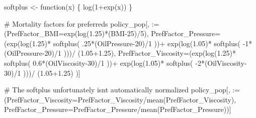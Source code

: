 \documentclass[
  letterpaper,
  DIV=11,
  numbers=noendperiod]{scrartcl}
\newenvironment{Shaded}{\begin{snugshade}}{\end{snugshade}}
\newcommand{\AttributeTok}[1]{\textcolor[rgb]{0.40,0.45,0.13}{#1}}
\newcommand{\CommentTok}[1]{\textcolor[rgb]{0.37,0.37,0.37}{#1}}
\newcommand{\ControlFlowTok}[1]{\textcolor[rgb]{0.00,0.23,0.31}{#1}}
\newcommand{\DecValTok}[1]{\textcolor[rgb]{0.68,0.00,0.00}{#1}}
\newcommand{\FloatTok}[1]{\textcolor[rgb]{0.68,0.00,0.00}{#1}}
\newcommand{\FunctionTok}[1]{\textcolor[rgb]{0.28,0.35,0.67}{#1}}
\newcommand{\NormalTok}[1]{\textcolor[rgb]{0.00,0.23,0.31}{#1}}
\newcommand{\OtherTok}[1]{\textcolor[rgb]{0.00,0.23,0.31}{#1}}
\newcommand{\SpecialCharTok}[1]{\textcolor[rgb]{0.37,0.37,0.37}{#1}}
\newcommand{\StringTok}[1]{\textcolor[rgb]{0.13,0.47,0.30}{#1}}
\begin{document}
\begin{Shaded}
\begin{Highlighting}[]
\NormalTok{softplus }\OtherTok{\textless{}{-}} \ControlFlowTok{function}\NormalTok{(x) \{}
  \FunctionTok{log}\NormalTok{(}\DecValTok{1}\SpecialCharTok{+}\FunctionTok{exp}\NormalTok{(x))}
\NormalTok{\}}

\CommentTok{\# Mortality factors for preferreds}
\NormalTok{policy\_pop[,}
           \StringTok{\textasciigrave{}}\AttributeTok{:=}\StringTok{\textasciigrave{}}\NormalTok{(}\AttributeTok{PrefFactor\_BMI=}\FunctionTok{exp}\NormalTok{(}\FunctionTok{log}\NormalTok{(}\FloatTok{1.25}\NormalTok{)}\SpecialCharTok{*}\NormalTok{(BMI}\DecValTok{{-}25}\NormalTok{)}\SpecialCharTok{/}\DecValTok{5}\NormalTok{),}
                \AttributeTok{PrefFactor\_Pressure=}\NormalTok{(}\FunctionTok{exp}\NormalTok{(}\FunctionTok{log}\NormalTok{(}\FloatTok{1.25}\NormalTok{)}\SpecialCharTok{*}
                                           \FunctionTok{softplus}\NormalTok{( .}\DecValTok{25}\SpecialCharTok{*}\NormalTok{(OilPressure}\DecValTok{{-}20}\NormalTok{)}\SpecialCharTok{/}\DecValTok{1}\NormalTok{ ))}\SpecialCharTok{+}
                                       \FunctionTok{exp}\NormalTok{(}\FunctionTok{log}\NormalTok{(}\FloatTok{1.05}\NormalTok{)}\SpecialCharTok{*}
                                             \FunctionTok{softplus}\NormalTok{( }\SpecialCharTok{{-}}\DecValTok{1}\SpecialCharTok{*}\NormalTok{(OilPressure}\DecValTok{{-}20}\NormalTok{)}\SpecialCharTok{/}\DecValTok{1}\NormalTok{ )))}\SpecialCharTok{/}
\NormalTok{                  (}\FloatTok{1.05+1.25}\NormalTok{),}
                \AttributeTok{PrefFactor\_Viscosity=}\NormalTok{(}\FunctionTok{exp}\NormalTok{(}\FunctionTok{log}\NormalTok{(}\FloatTok{1.25}\NormalTok{)}\SpecialCharTok{*}
                                            \FunctionTok{softplus}\NormalTok{( }\FloatTok{0.6}\SpecialCharTok{*}\NormalTok{(OilViscosity}\DecValTok{{-}30}\NormalTok{)}\SpecialCharTok{/}\DecValTok{1}\NormalTok{ ))}\SpecialCharTok{+}
                                        \FunctionTok{exp}\NormalTok{(}\FunctionTok{log}\NormalTok{(}\FloatTok{1.05}\NormalTok{)}\SpecialCharTok{*}
                                              \FunctionTok{softplus}\NormalTok{( }\SpecialCharTok{{-}}\DecValTok{2}\SpecialCharTok{*}\NormalTok{(OilViscosity}\DecValTok{{-}30}\NormalTok{)}\SpecialCharTok{/}\DecValTok{1}\NormalTok{ )))}\SpecialCharTok{/}
\NormalTok{                  (}\FloatTok{1.05+1.25}\NormalTok{)}
\NormalTok{                )]}

\CommentTok{\# The softplus unfortunately isn\textquotesingle{}t automatically normalized}
\NormalTok{policy\_pop[,}
           \StringTok{\textasciigrave{}}\AttributeTok{:=}\StringTok{\textasciigrave{}}\NormalTok{(}\AttributeTok{PrefFactor\_Viscosity=}\NormalTok{PrefFactor\_Viscosity}\SpecialCharTok{/}\FunctionTok{mean}\NormalTok{(PrefFactor\_Viscosity),}
                \AttributeTok{PrefFactor\_Pressure=}\NormalTok{PrefFactor\_Pressure}\SpecialCharTok{/}\FunctionTok{mean}\NormalTok{(PrefFactor\_Pressure))]}


\end{Highlighting}
\end{Shaded}
\end{document}
